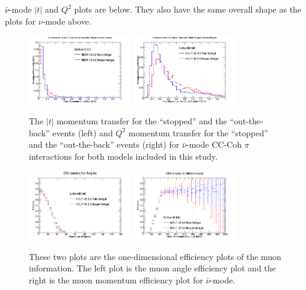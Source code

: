 \documentclass[11pt]{article}
\begin{document}
$\bar{\nu}$-mode $|t|$ and $Q^2$ plots are below. They also have the same overall shape as the plots for $\nu$-mode above.

\begin{figure}[H]
\centering
\includegraphics[width=0.4\textwidth]{CCCohPlots/ANMCCCohGoodT.png}
\includegraphics[width=0.4\textwidth]{CCCohPlots/ANMCCCohGoodQ2.png}
\caption{The $|t|$ momentum transfer for the ``stopped'' and the ``out-the-back'' events (left) and $Q^2$ momentum transfer for the ``stopped'' and the ``out-the-back'' events (right) for $\bar{\nu}$-mode CC-Coh $\pi$ interactions for both models included in this study.}
\label{fig:AntiNuModeCCCohGoodTAndQ2}
\end{figure}





\begin{figure}[H]
\centering
\includegraphics[width=0.4\textwidth]{ANMCombinedPlotsImages/17-ANMCombinedPlots.png}
\includegraphics[width=0.4\textwidth]{ANMCombinedPlotsImages/18-ANMCombinedPlots.png}
\caption{These two plots are the one-dimensional efficiency plots of the muon information. The left plot is the muon angle efficiency plot and the right is the muon momentum efficiency plot for $\bar{\nu}$-mode.}
\label{fig:MomAngEffANM}
\end{figure}
\end{document}

